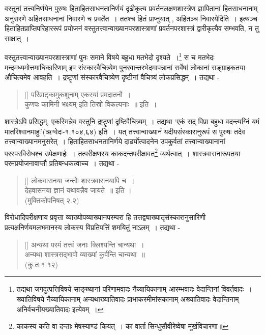 	वस्तूनां तत्त्वनिर्णयेन पुरुषः हिताहितसाधनतानिर्णयं दृढीकृत्य प्रवर्तनलक्षणशास्त्रेण ज्ञापितानां हितसाधनानाम् अनुसरणे अहितसाधनानां निवारणे च प्रवर्तेत~। ततश्च हितं प्राप्नुयात् , अहितञ्च निवारयेदिति~। इत्थञ्च हिताहितप्राप्तिपरिहाररूपं  प्रयोजनं वस्तुतत्त्वान्वाख्यानपरशास्त्राणां प्रवर्तनपरशास्त्रं द्वारीकृत्यैव सम्भवति, न तु साक्षात्~। 

	वस्तुतत्त्वान्वाख्यानपरशास्त्राणां पुनः समाने विषये बहुधा मतभेदो दृश्यते~।\footnote{\small तद्यथा जगदुत्पत्तिविषये साङ्ख्यानां परिणामवादः नैय्यायिकानाम् आरम्भवादः वेदान्तिनां विवर्तवादः~। ख्यातिविषये नैय्यायिकानाम् अन्यथाख्यातिवादः प्राभाकरमीमांसकानाम् अख्यातिवादः वेदान्तिनाम् अनिर्वचनीयख्यातिवादः इत्येवम्~।\clearpage } स च मतभेदः मन्दमध्यमोत्तमाधिकारिणाम् इव संस्कारवैचित्र्येण पुनरवान्तरभेदमापन्नानां सर्वेषां लोकानां सङ्ग्राहकतया औचित्यमेव आवहति~। द्रष्टॄणां संस्कारवैचित्र्येण दृष्टीनां वैचित्र्यं लोकप्रसिद्धम्~। तद्यथा - 
\begin{verse}[\versewidth]
		परिव्राट्‌कामुकशुनाम् एकस्यां प्रमदातनौ~।\\[-6pt]
		कुणपः कामिनी भक्ष्यम् इति तिस्रो विकल्पनाः~॥ इति~।
\end{verse}

	शास्त्रेऽपि प्रसिद्धम्, एकस्मिन्नेव वस्तुनि द्रष्टॄणां दृष्टिवैचित्र्यम्~। तद्यथा ‘एकं सद् विप्रा बहुधा वदन्त्यग्निं यमं मातरिश्वानमाहुः’(ऋग्वेदः-१.१०४,६४) इति~। यत् तत्त्वान्वाख्यानं यदीयसंस्कारानुरूपं स पुरुषः तदेव तत्त्वान्वाख्यानमनुसरेत्~। हिताहितसाधनतानिर्णये दार्ढ्योत्पादनेन उपकुर्वतां तत्त्वान्वाख्यानानां परस्परविरोधश्च उपेक्षणार्हः~। तत्परीक्षणस्य काकदन्तपरीक्षावत्\footnote{\small काकस्य कति वा दन्ताः मेषस्याण्डं कियत्~। का वार्ता सिन्धुसौवीरेष्वेषा मूर्खविचारणा॥}  व्यर्थत्वात्~। शास्त्रवासनारूपतया परमप्रयोजनावाप्तौ प्रतिबन्धकत्वाच्च~। तद्यथा -
\begin{verse}[\versewidth]
		लोकवासनया जन्तोः शास्त्रवासनयापि च~।\\[-6pt]
		देहवासनया ज्ञानं यथावन्नैव जायते~॥ इति ।\\ \hfill (मुक्तिकोपनिषत् २.२) 
\end{verse}

  विरोधादिपरीक्षणाय प्रवृत्ता व्याख्योपव्याख्यानपरम्परा हि तत्तद्व्याख्यातृसंस्कारानुसारिणी प्रत्यक्षनिर्णयमलभमानस्य लोकस्य विप्रतिपत्तिं शमयितुं नाऽलम्~। तद्यथा -
\begin{verse}[\versewidth]
		अन्यथा परमं तत्त्वं जनाः क्लिश्यन्ति चान्यथा~।\\[-6pt]
		अन्यथा शास्त्रसद्भावो व्याख्यां कुर्वन्ति चान्यथा~॥\\ \hfill (कु.त.१.१२) 
\end{verse}

